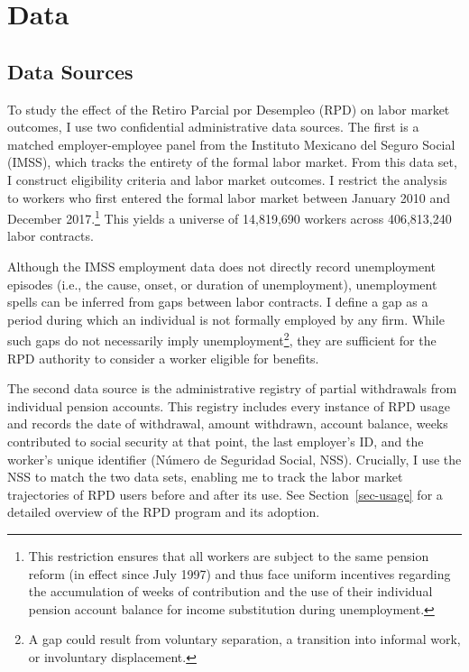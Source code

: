 \documentclass[
  4pt,
]{report}
\begin{document}
\chapter{Data}\label{sec-data}

\section{Data Sources}\label{data-sources}

To study the effect of the Retiro Parcial por Desempleo (RPD) on labor
market outcomes, I use two confidential administrative data sources. The
first is a matched employer-employee panel from the Instituto Mexicano
del Seguro Social (IMSS), which tracks the entirety of the formal labor
market. From this data set, I construct eligibility criteria and labor
market outcomes. I restrict the analysis to workers who first entered
the formal labor market between January 2010 and December
2017.\footnote{This restriction ensures that all workers are subject to
  the same pension reform (in effect since July 1997) and thus face
  uniform incentives regarding the accumulation of weeks of contribution
  and the use of their individual pension account balance for income
  substitution during unemployment.} This yields a universe of
14,819,690 workers across 406,813,240 labor contracts.

Although the IMSS employment data does not directly record unemployment
episodes (i.e., the cause, onset, or duration of unemployment),
unemployment spells can be inferred from gaps between labor contracts. I
define a gap as a period during which an individual is not formally
employed by any firm. While such gaps do not necessarily imply
unemployment\footnote{A gap could result from voluntary separation, a
  transition into informal work, or involuntary displacement.}, they are
sufficient for the RPD authority to consider a worker eligible for
benefits.

The second data source is the administrative registry of partial
withdrawals from individual pension accounts. This registry includes
every instance of RPD usage and records the date of withdrawal, amount
withdrawn, account balance, weeks contributed to social security at that
point, the last employer's ID, and the worker's unique identifier
(Número de Seguridad Social, NSS). Crucially, I use the NSS to match the
two data sets, enabling me to track the labor market trajectories of RPD
users before and after its use. See Section~\ref{sec-usage} for a
detailed overview of the RPD program and its adoption.
\end{document}
